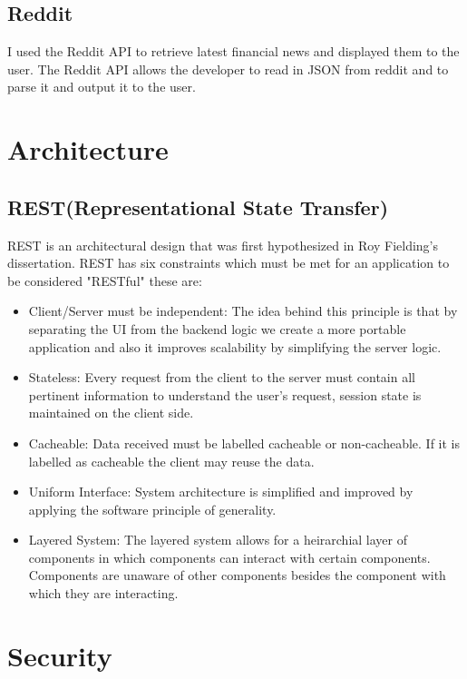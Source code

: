 \subsection{Reddit}
I used the Reddit API to retrieve latest financial news and displayed them to the user.  The Reddit API allows the developer to read in JSON from reddit and to parse it and output it to the user.
\section{Architecture}
\subsection{REST(Representational State Transfer)}
REST is an architectural design that was first hypothesized in Roy Fielding's dissertation\cite{Fielding}.  REST has six constraints which must be met for an application to be considered "RESTful" these are:
\begin{itemize}
  \item Client/Server must be independent: The idea behind this principle is that by separating the UI from the backend logic we create a more portable application and also it improves scalability by simplifying the server logic.
  \item Stateless:  Every request from the client to the server must contain all pertinent information to understand the user's request, session state is maintained on the client side.
  \item Cacheable: Data received must be labelled cacheable or non-cacheable.  If it is labelled as cacheable the client may reuse the data.
  \item Uniform Interface: System architecture is simplified and improved by applying the software principle of generality.
  \item Layered System: The layered system allows for a heirarchial layer of components in which components can interact with certain components.  Components are unaware of other components besides the component with which they are interacting.
\end{itemize}
\section{Security}
